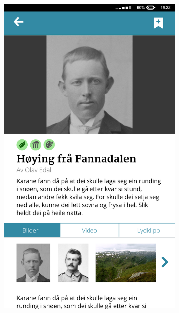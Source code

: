 \begin{figure}
\begin{subfigure}[h]{0.3\textwidth}
	\end{subfigure}
	\begin{subfigure}[h]{0.3\textwidth}
		\includegraphics[width=\textwidth]{fig/prototype2}
	\end{subfigure}
	\begin{subfigure}[h]{0.3\textwidth}

\end{subfigure}
\end{figure}
